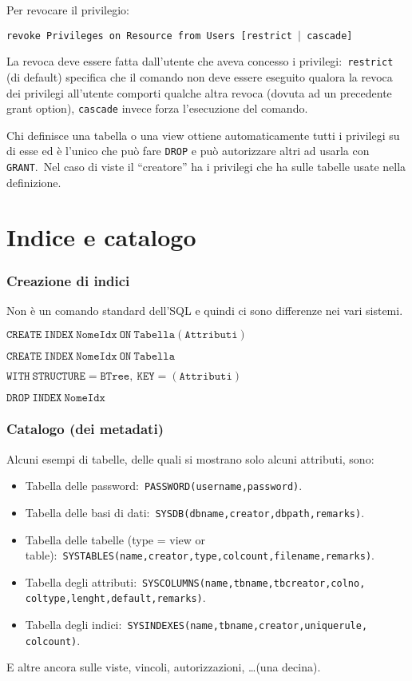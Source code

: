 \noindent Per revocare il privilegio:
\begin{center}
	\texttt{revoke Privileges on Resource from Users [restrict $|$ cascade]}
\end{center}

\noindent La revoca deve essere fatta dall'utente che aveva concesso i privilegi:\ \texttt{re\-strict} (di default) specifica che il comando non deve essere eseguito qualora la revoca dei privilegi all'utente comporti qualche altra revoca (dovuta ad un precedente grant option), \texttt{cascade} invece forza l'esecuzione del comando.

Chi definisce una tabella o una view ottiene automaticamente tutti i privilegi su di esse ed è l'unico che può fare \texttt{DROP} e può autorizzare altri ad usarla con \texttt{GRANT}.\
Nel caso di viste il ``creatore'' ha i privilegi che ha sulle tabelle usate nella definizione.

\section{Indice e catalogo}

\subsubsection{Creazione di indici}
Non è un comando standard dell'SQL e quindi ci sono differenze nei vari sistemi.\

\begin{flushleft}
	$\mathtt{CREATE\ INDEX\ NomeIdx\ ON\ Tabella(Attributi)}$

	$\mathtt{CREATE\ INDEX\ NomeIdx\ ON\ Tabella }$

	\quad $\mathtt{WITH\ STRUCTURE = BTree,\ KEY = (Attributi)}$

	$\mathtt{DROP\ INDEX\ NomeIdx}$
\end{flushleft}

\subsubsection{Catalogo (dei metadati)}

Alcuni esempi di tabelle, delle quali si mostrano solo alcuni attributi, sono:
\begin{itemize}
	\item Tabella delle password:\ \texttt{PASSWORD(username,password)}.
	\item Tabella delle basi di dati:\ \texttt{SYSDB(dbname,creator,dbpath,remarks)}.
	\item Tabella delle tabelle (type = view or table):\ \texttt{SYSTABLES(name,crea\-tor,type,colcount,filename,remarks)}.
	\item Tabella degli attributi:\ \texttt{SYSCOLUMNS(name,tbname,tbcreator,colno, coltype,lenght,default,remarks)}.
	\item Tabella degli indici:\ \texttt{SYSINDEXES(name,tbname,creator,uniquerule, colcount)}.
\end{itemize}
E altre ancora sulle viste, vincoli, autorizzazioni, \dots (una decina).

